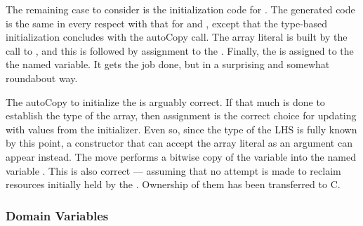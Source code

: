 The remaining case to consider is the initialization code for .  The generated
code is the same in every respect with that for  and , except that the
type-based initialization concludes with the autoCopy call.  The array literal is built by
the call to , and this is followed by assignment to the
.  Finally, the  is assigned to the the named variable.  It
gets the job done, but in a surprising and somewhat roundabout way.

The autoCopy to initialize the  is arguably correct.
If that much is done to establish the type of the array, then assignment is the correct
choice for updating with values from the initializer.  Even so, since the type of the LHS
is fully known by this point, a constructor that can accept the array literal as an
argument can appear instead.  The move performs a bitwise copy of the 
variable into the named variable .  This is also correct --- assuming that no
attempt is made to reclaim resources initially held by the .  Ownership of
them has been transferred to C.

\subsubsection{Domain Variables}

